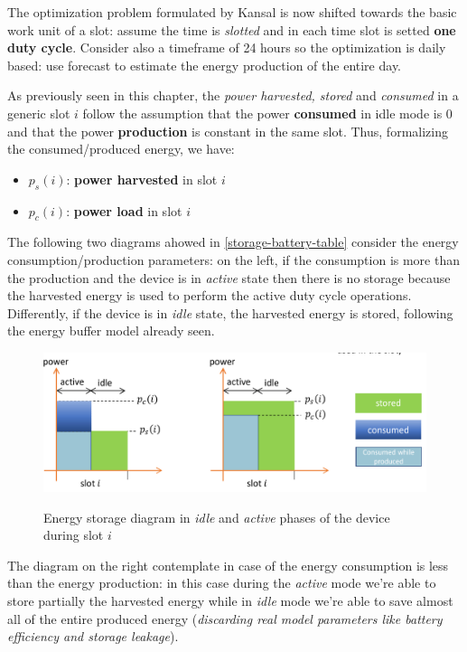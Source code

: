 \documentclass[10pt,a4paper]{report}
\theoremstyle{definition}
\begin{document}
The optimization problem formulated by Kansal is now shifted towards the basic work unit of a slot: assume the time is \textit{slotted} and in each time slot is setted \textbf{one duty cycle}. Consider also a timeframe of 24 hours so the optimization is daily based: use forecast to estimate the energy production of the entire day.

As previously seen in this chapter, the \textit{power harvested, stored} and \textit{consumed} in a generic slot $i$ follow the assumption that the power \textbf{consumed} in idle mode is $0$ and that the power \textbf{production} is constant in the same slot. Thus, formalizing the consumed/produced energy, we have:
\begin{itemize}
	\item 
	$p_{s}(i)$: \textbf{power harvested} in slot $i$
	\item 
	$p_{c}(i)$: \textbf{power load} in slot $i$
\end{itemize}

The following two diagrams ahowed in \ref{storage-battery-table} consider the energy consumption/production parameters: on the left, if the consumption is more than the production and the device is in \textit{active} state then there is no storage because the harvested energy is used to perform the active duty cycle operations. Differently, if the device is in \textit{idle} state, the harvested energy is stored, following the energy buffer model already seen.
\begin{figure}[h]
	\centering\includegraphics[scale=0.40]{images/Pasted image 20230509165631.png}
	\label{storage-energy-diagram}
	\caption{Energy storage diagram in \textit{idle} and \textit{active} phases of the device during slot $i$}
\end{figure}


The diagram on the right contemplate in case of the energy consumption is less than the energy production: in this case during the \textit{active} mode we're able to store partially the harvested energy while in \textit{idle} mode we're able to save almost all of the entire produced energy (\textit{discarding real model parameters like battery efficiency and storage leakage}).
\end{document}
